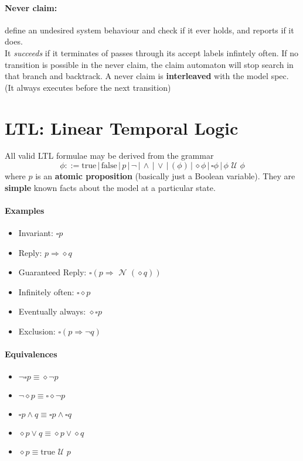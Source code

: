 \documentclass{article}
\newcommand{\U}{\,\,\mathcal{U}\,\,}
\newcommand{\N}{\,\,\mathcal{N}\,\,}
\begin{document}
\paragraph{Never claim:} define an undesired system behaviour and check if it
ever holds, and reports if it does.
\\
It \textit{succeeds} if it terminates of passes through its accept labels
infintely often. If no transition is possible in the never claim, the claim
automaton will stop search in that branch and backtrack.
A never claim is \textbf{interleaved} with the model spec. (It always executes
before the next transition)

\section{LTL: Linear Temporal Logic}
All valid LTL formulae may be derived from the grammar
\[
  \phi ::= \text{true} \,|\, \text{false} \,|\, p \,|\, \neg \,|\, \land \,|\,
  \lor \,|\, ( \phi ) \,|\, \diamond \phi \,|\, \square \phi \,|\, \phi \U \phi
\]
where $p$ is an \textbf{atomic proposition} (basically just a Boolean variable).
They are \textbf{simple} known facts about the model at a particular state.
\paragraph{Examples}
\begin{itemize}
\item Invariant: $\square p$
\item Reply: $p \Rightarrow \diamond q$
\item Guaranteed Reply: $\square(p \Rightarrow \N (\diamond q))$
\item Infinitely often: $\square\diamond p$
\item Eventually always: $\diamond\square p$
\item Exclusion: $\square(p \Rightarrow \neg q)$
\end{itemize}

\paragraph{Equivalences}
\begin{itemize}
\item $\neg\square p \equiv \diamond\neg p$
\item $\neg\diamond p \equiv \square \diamond\neg p$
\item $\square p \land q \equiv \square p \land \square q$ 
\item $\diamond p \lor q \equiv \diamond p \lor \diamond q$ 
\item $\diamond p \equiv \text{true} \U p$
\end{itemize}
\end{document}
